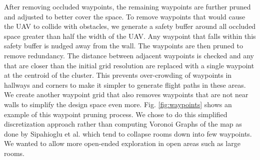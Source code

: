 \documentclass[letterpaper, 10 pt, conference]{ieeeconf}  %
\begin{document}
After removing occluded waypoints, the remaining waypoints are further pruned and adjusted to better cover the space. To remove waypoints that would cause the UAV to collide with obstacles, we generate a safety buffer around all occluded space greater than half the width of the UAV. Any waypoint that falls within this safety buffer is nudged away from the wall. The waypoints are then pruned to remove redundancy. The distance between adjacent waypoints is checked and any that are closer than the initial grid resolution are replaced with a single waypoint at the centroid of the cluster. This prevents over-crowding of waypoints in hallways and corners to make it simpler to generate flight paths in these areas. We create another waypoint grid that also removes waypoints that are not near walls to simplify the design space even more. Fig. \ref{fig:waypoints} shows an example of this waypoint pruning process. We chose to do this simplified discretization approach rather than computing Voronoi Graphs of the map as done by Sipahioglu et al. \cite{Sipahioglu2010} which tend to collapse rooms down into few waypoints. We wanted to allow more open-ended exploration in open areas such as large rooms.
\end{document}
